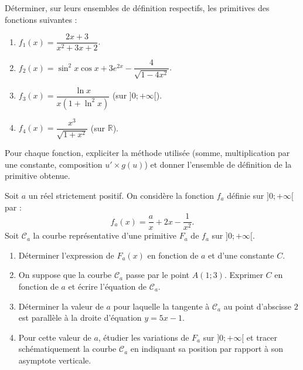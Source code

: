 \documentclass[11pt]{article}
\begin{document}
\begin{exercice}
Déterminer, sur leurs ensembles de définition respectifs, les primitives des fonctions suivantes :
\begin{enumerate}
    \item $f_1(x) = \dfrac{2x+3}{x^2+3x+2}$.
    \item $f_2(x) = \sin^2 x \cos x + 3e^{2x} - \dfrac{4}{\sqrt{1-4x^2}}$.
    \item $f_3(x) = \dfrac{\ln x}{x(1+\ln^2 x)}$ (sur $]0;+\infty[$).
    \item $f_4(x) = \dfrac{x^3}{\sqrt{1+x^2}}$ (sur $\mathbb{R}$).
\end{enumerate}
Pour chaque fonction, expliciter la méthode utilisée (somme, multiplication par une constante, composition $u' \times g(u)$) et donner l'ensemble de définition de la primitive obtenue.
\end{exercice}

\begin{exercice}
Soit $a$ un réel strictement positif. On considère la fonction $f_a$ définie sur $]0;+\infty[$ par :
$$ f_a(x) = \frac{a}{x} + 2x - \frac{1}{x^2}. $$
Soit $\mathcal{C}_a$ la courbe représentative d'une primitive $F_a$ de $f_a$ sur $]0;+\infty[$.
\begin{enumerate}
    \item Déterminer l'expression de $F_a(x)$ en fonction de $a$ et d'une constante $C$.
    \item On suppose que la courbe $\mathcal{C}_a$ passe par le point $A(1; 3)$. Exprimer $C$ en fonction de $a$ et écrire l'équation de $\mathcal{C}_a$.
    \item Déterminer la valeur de $a$ pour laquelle la tangente à $\mathcal{C}_a$ au point d'abscisse $2$ est parallèle à la droite d'équation $y = 5x - 1$.
    \item Pour cette valeur de $a$, étudier les variations de $F_a$ sur $]0;+\infty[$ et tracer schématiquement la courbe $\mathcal{C}_a$ en indiquant sa position par rapport à son asymptote verticale.
\end{enumerate}
\end{exercice}
\end{document}
